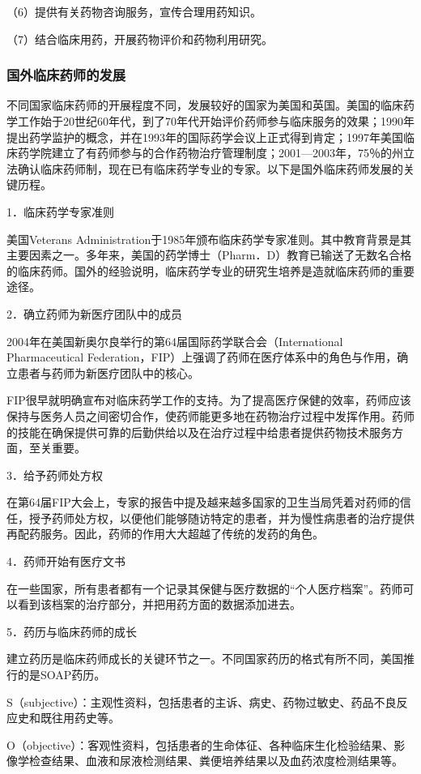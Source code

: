 （6）提供有关药物咨询服务，宣传合理用药知识。

（7）结合临床用药，开展药物评价和药物利用研究。

\subsubsection{国外临床药师的发展}

不同国家临床药师的开展程度不同，发展较好的国家为美国和英国。美国的临床药学工作始于20世纪60年代，到了70年代开始评价药师参与临床服务的效果；1990年提出药学监护的概念，并在1993年的国际药学会议上正式得到肯定；1997年美国临床药学院建立了有药师参与的合作药物治疗管理制度；2001---2003年，75％的州立法确认临床药师制，现在已有临床药学专业的专家。以下是国外临床药师发展的关键历程。

1．临床药学专家准则

美国Veterans
Administration于1985年颁布临床药学专家准则。其中教育背景是其主要因素之一。多年来，美国的药学博士（Pharm．D）教育已输送了无数名合格的临床药师。国外的经验说明，临床药学专业的研究生培养是造就临床药师的重要途径。

2．确立药师为新医疗团队中的成员

2004年在美国新奥尔良举行的第64届国际药学联合会（International
Pharmaceutical
Federation，FIP）上强调了药师在医疗体系中的角色与作用，确立患者与药师为新医疗团队中的核心。

FIP很早就明确宣布对临床药学工作的支持。为了提高医疗保健的效率，药师应该保持与医务人员之间密切合作，使药师能更多地在药物治疗过程中发挥作用。药师的技能在确保提供可靠的后勤供给以及在治疗过程中给患者提供药物技术服务方面，至关重要。

3．给予药师处方权

在第64届FIP大会上，专家的报告中提及越来越多国家的卫生当局凭着对药师的信任，授予药师处方权，以便他们能够随访特定的患者，并为慢性病患者的治疗提供再配药服务。因此，药师的作用大大超越了传统的发药的角色。

4．药师开始有医疗文书

在一些国家，所有患者都有一个记录其保健与医疗数据的``个人医疗档案''。药师可以看到该档案的治疗部分，并把用药方面的数据添加进去。

5．药历与临床药师的成长

建立药历是临床药师成长的关键环节之一。不同国家药历的格式有所不同，美国推行的是SOAP药历。

S（subjective）：主观性资料，包括患者的主诉、病史、药物过敏史、药品不良反应史和既往用药史等。

O（objective）：客观性资料，包括患者的生命体征、各种临床生化检验结果、影像学检查结果、血液和尿液检测结果、粪便培养结果以及血药浓度检测结果等。


